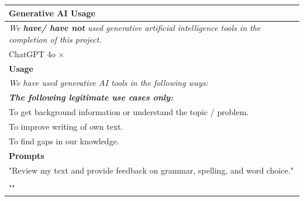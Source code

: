 \documentclass[twoside, a4paper, 11pt]{article}
\begin{document}

\begin{table}[ht]
		\centering
	\begin{tabular}{l}
			\toprule
			\rowcolor[rgb]{0.9,0.9,0.9} \textbf{Generative AI Usage} \\
			\midrule
			\textit{We \textbf{have/ have not} used generative artificial intelligence tools in the completion of this project.}\\
			ChatGPT 4o $\times$ \\ %
			\midrule
			\rowcolor[rgb]{0.9,0.9,0.9} \textbf{Usage} \\
			\midrule
			\textit{We have used generative AI tools in the following ways:}\\
			\textit{\small \textbf{The following legitimate use cases only:}}\\
			To get background information or understand the topic / problem.\\
			To improve writing of own text.\\
			To find gaps in our knowledge.\\
			\midrule
			\rowcolor[rgb]{0.9,0.9,0.9} \textbf{Prompts} \\
			\midrule
			"Review my text and provide feedback on grammar, spelling, and word choice."\\
			\\
			\noindent
			"" \\ %
			\bottomrule
	\end{tabular}
\end{table}
	
% 
% 
	
\end{document}
